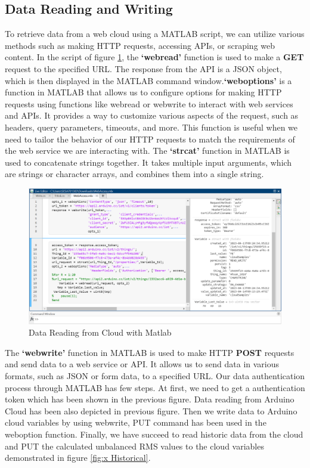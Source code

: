 \subsection{Data Reading and Writing}
To retrieve data from a web cloud using a MATLAB script, we can utilize various methods such as making HTTP requests, accessing APIs, or scraping web content. In the script of figure \ref{fig:x Matlab Response2}, the \textbf{‘webread’} function is used to make a \textbf{GET} request to the specified URL. The response from the API is a JSON object, which is then displayed in the MATLAB command window.\textbf{‘weboptions’} is a function in MATLAB that allows us to configure options for making HTTP requests using functions like webread or webwrite to interact with web services and APIs. It provides a way to customize various aspects of the request, such as headers, query parameters, timeouts, and more. This function is useful when we need to tailor the behavior of our HTTP requests to match the requirements of the web service we are interacting with.
The \textbf{‘strcat’} function in MATLAB is used to concatenate strings together. It takes multiple input arguments, which are strings or character arrays, and combines them into a single string.\par
\begin{figure}[htbp]
\centering
\includegraphics[scale=0.5]{images/Matlab Response2.PNG}
\caption{Data Reading from Cloud with Matlab}
\label{fig:x Matlab Response2}
\end{figure}
The \textbf{‘webwrite’} function in MATLAB is used to make HTTP \textbf{POST} requests and send data to a web service or API. It allows us to send data in various formats, such as JSON or form data, to a specified URL. Our data authentication process through MATLAB has few steps. At first, we need to get a authentication token which has been shown in the previous figure. Data reading from Arduino Cloud has been also depicted in previous figure. Then we write data to Arduino cloud variables by using webwrite, PUT command has been used in the weboption function. Finally, we have succeed to read historic data from the cloud and PUT the calculated unbalanced RMS values to the cloud variables demonstrated in figure \ref{fig:x Historical}.
